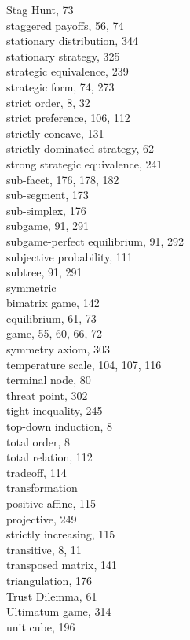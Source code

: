 \documentclass[12pt]{article}
\begin{document}
Stag Hunt, 73\\
staggered payoffs, 56, 74\\
stationary distribution, 344\\
stationary strategy, 325\\
strategic equivalence, 239\\
strategic form, 74, 273\\
strict order, 8, 32\\
strict preference, 106, 112\\
strictly concave, 131\\
strictly dominated strategy, 62\\
strong strategic equivalence, 241\\
sub-facet, 176, 178, 182\\
sub-segment, 173\\
sub-simplex, 176\\
subgame, 91, 291\\
subgame-perfect equilibrium, 91, 292\\
subjective probability, 111\\
subtree, 91, 291\\
symmetric\\
bimatrix game, 142\\
equilibrium, 61, 73\\
game, 55, 60, 66, 72\\
symmetry axiom, 303\\
temperature scale, 104, 107, 116\\
terminal node, 80\\
threat point, 302\\
tight inequality, 245\\
top-down induction, 8\\
total order, 8\\
total relation, 112\\
tradeoff, 114\\
transformation\\
positive-affine, 115\\
projective, 249\\
strictly increasing, 115\\
transitive, 8, 11\\
transposed matrix, 141\\
triangulation, 176\\
Trust Dilemma, 61\\
Ultimatum game, 314\\
unit cube, 196\\
\end{document}
